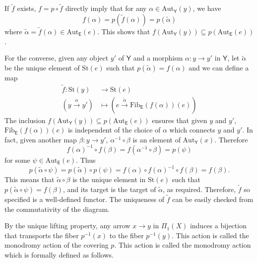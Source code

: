 \documentclass{report}
\begin{document}
\begin{prf}
	If $\widetilde{f}$ exists, $f=p\circ \widetilde{f}$ directly imply that for any $\alpha\in \mathrm{Aut}_\mathsf{Y}(y)$, we have
	\[
		f(\alpha)=p\left(\widetilde{f}(\alpha)\right)=p(\tilde{\alpha})
	\]
	where $\tilde{\alpha}= \widetilde{f}(\alpha)\in \mathrm{Aut}_\mathsf{E}(e)$. This shows that $f\left(\mathrm{Aut}_\mathsf{Y}(y)\right)\subseteq p\left(\mathrm{Aut}_\mathsf{E}(e)\right)$.

	For the converse, given any object $y'$ of $\mathsf{Y}$ and a morphism $\alpha: y\to y'$ in $\mathsf{Y}$, let $\tilde{\alpha}$ be the unique element of  $\mathrm{St}\left(e\right)$ such that $p(\tilde{\alpha})=f(\alpha)$ and we can define a map
	\begin{align*}
		\widetilde{f}:\mathrm{St}(y)          & \longrightarrow\mathrm{St}(e)                                                                              \\
		\left(y\xrightarrow{\alpha} y'\right) & \longmapsto \left(e\xrightarrow{\tilde{\alpha}} \mathrm{Fib}_{\mathsf{E}}(f(\alpha))\left(e\right) \right)
	\end{align*}
	The inclusion $f\left(\mathrm{Aut}_\mathsf{Y}(y)\right)\subseteq p\left(\mathrm{Aut}_\mathsf{E}(e)\right)$ ensures that given $y$ and $y'$, $\mathrm{Fib}_{\mathsf{E}}(f(\alpha))\left(e\right)$ is independent of the choice of $\alpha$ which connects $y$ and $y'$. In fact, given another map $\beta: y \to y'$, $\alpha^{-1} \circ \beta$ is an element of $\mathrm{Aut}_\mathsf{Y}\left( x\right)$. Therefore
	$$
		f(\alpha)^{-1} \circ f\left(\beta\right)=f\left(\alpha^{-1} \circ \beta\right)=p(\psi)
	$$
	for some $\psi \in \mathrm{Aut}_\mathsf{E}\left( e\right)$. Thus
	$$
		p(\tilde{\alpha} \circ \psi)=p(\tilde{\alpha}) \circ p(\psi)=f(\alpha) \circ f(\alpha)^{-1} \circ f\left(\beta\right)=f\left(\beta\right) .
	$$
	This means that $\tilde{\alpha} \circ \beta$ is the unique element in $\mathrm{St}\left(e\right)$ such that $p\left(\tilde{\alpha} \circ \psi\right)=f\left(\beta\right)$, and its target is the target of $\tilde{\alpha}$, as required. Therefore,	$\widetilde{f}$ so specified is a well-defined functor. The uniqueness of $\widetilde{f}$ can be easily checked from the commutativity of the diagram.
\end{prf}

By the unique lifting property, any arrow $x\to y$ in $\Pi_1(X)$ induces a bijection that transports the fiber $p^{-1}(x)$ to the fiber $p^{-1}(y)$. This action is called the monodromy action of the covering $p$. This action is called the monodromy action which is formally defined as follows.
\end{document}
